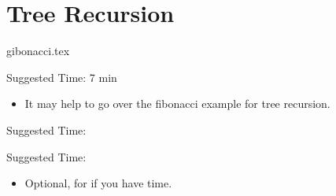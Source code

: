 \documentclass{exam}
\begin{document}
\section{Tree Recursion}
\begin{questions}
    {gibonacci.tex}
    \begin{questionmeta}
        Suggested Time: 7 min
        \begin{itemize}
            \item It may help to go over the fibonacci example for tree recursion.
        \end{itemize}
    \end{questionmeta}

    {}
    \begin{questionmeta}
        Suggested Time:
    \end{questionmeta}

    {}
    \begin{questionmeta}
    Suggested Time:
    \begin{itemize}
            \item Optional, for if you have time. 
        \end{itemize}
    \end{questionmeta}

\end{questions}
\end{document}
